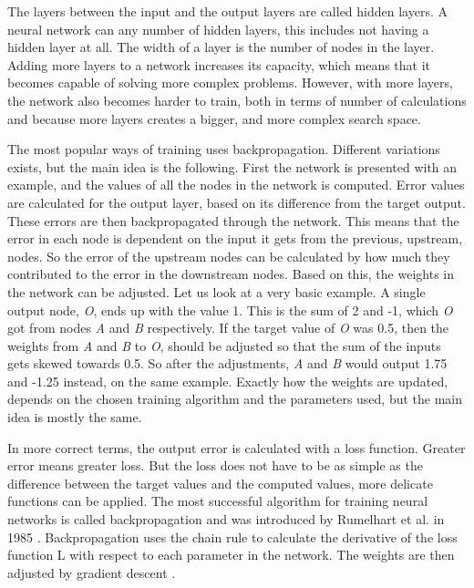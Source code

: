 The layers between the input and the output layers are called hidden layers. A neural network can any number of hidden layers, this includes not having a hidden layer at all. The width of a layer is the number of nodes in the layer. Adding more layers to a network increases its capacity, which means that it becomes capable of solving more complex problems. However, with more layers, the network also becomes harder to train, both in terms of number of calculations and because more layers creates a bigger, and more complex search space.

The most popular ways of training uses backpropagation. Different variations exists, but the main idea is the following. First the network is presented with an example, and the values of all the nodes in the network is computed. Error values are calculated for the output layer, based on its difference from the target output. These errors are then backpropagated through the network. This means that the error in each node is dependent on the input it gets from the previous, upstream, nodes. So the error of the upstream nodes can be calculated by how much they contributed to the error in the downstream nodes. Based on this, the weights in the network can be adjusted. Let us look at a very basic example. A single output node, \textit{O}, ends up with the value 1. This is the sum of 2 and -1, which \textit{O} got from nodes \textit{A} and \textit{B} respectively. If the target value of \textit{O} was 0.5, then the weights from \textit{A} and \textit{B} to \textit{O}, should be adjusted so that the sum of the inputs gets skewed towards 0.5. So after the adjustments, \textit{A} and \textit{B} would output 1.75 and -1.25 instead, on the same example. Exactly how the weights are updated, depends on the chosen training algorithm and the parameters used, but the main idea is mostly the same.

In more correct terms, the output error is calculated with a loss function. Greater error means greater loss. But the loss does not have to be as simple as the difference between the target values and the computed values, more delicate functions can be applied. The most successful algorithm for training neural networks is called backpropagation and was introduced by Rumelhart et al. in 1985 \cite{DBLP:journals/corr/Lipton15} \cite{Rumelhart:1986:LIR:104279.104293}. Backpropagation uses the chain rule to calculate the derivative of the loss function L with respect to each parameter in the network. The weights are then adjusted by gradient descent \cite{DBLP:journals/corr/Lipton15}.

